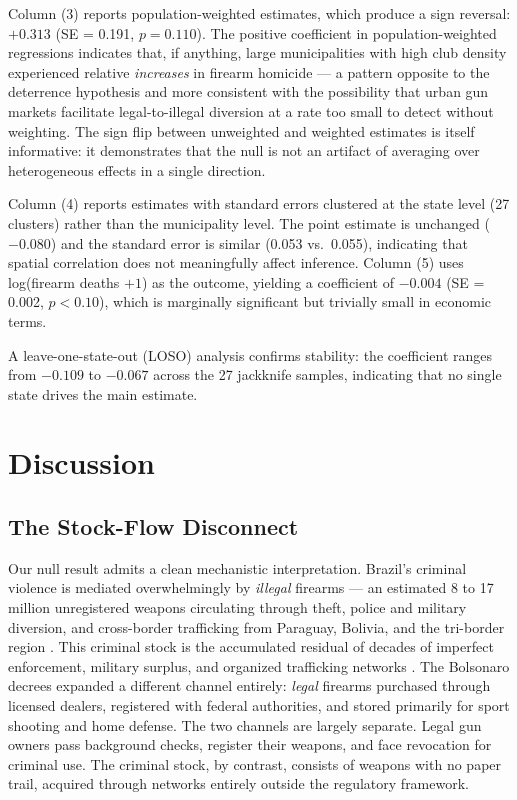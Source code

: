\documentclass[12pt]{article}
\begin{document}
Column (3) reports population-weighted estimates, which produce a sign reversal: $+0.313$ (SE = 0.191, $p = 0.110$). The positive coefficient in population-weighted regressions indicates that, if anything, large municipalities with high club density experienced relative \textit{increases} in firearm homicide --- a pattern opposite to the deterrence hypothesis and more consistent with the possibility that urban gun markets facilitate legal-to-illegal diversion at a rate too small to detect without weighting. The sign flip between unweighted and weighted estimates is itself informative: it demonstrates that the null is not an artifact of averaging over heterogeneous effects in a single direction.

Column (4) reports estimates with standard errors clustered at the state level (27 clusters) rather than the municipality level. The point estimate is unchanged ($-0.080$) and the standard error is similar (0.053 vs.\ 0.055), indicating that spatial correlation does not meaningfully affect inference. Column (5) uses log(firearm deaths $+ 1$) as the outcome, yielding a coefficient of $-0.004$ (SE = 0.002, $p < 0.10$), which is marginally significant but trivially small in economic terms.

A leave-one-state-out (LOSO) analysis confirms stability: the coefficient ranges from $-0.109$ to $-0.067$ across the 27 jackknife samples, indicating that no single state drives the main estimate.

{\small}


\section{Discussion}
\label{sec:discussion}

\subsection{The Stock-Flow Disconnect}

Our null result admits a clean mechanistic interpretation. Brazil's criminal violence is mediated overwhelmingly by \textit{illegal} firearms --- an estimated 8 to 17 million unregistered weapons circulating through theft, police and military diversion, and cross-border trafficking from Paraguay, Bolivia, and the tri-border region \citep{cerqueira2004, fbsp2022armas}. This criminal stock is the accumulated residual of decades of imperfect enforcement, military surplus, and organized trafficking networks \citep{dubevargas2013}. The Bolsonaro decrees expanded a different channel entirely: \textit{legal} firearms purchased through licensed dealers, registered with federal authorities, and stored primarily for sport shooting and home defense. The two channels are largely separate. Legal gun owners pass background checks, register their weapons, and face revocation for criminal use. The criminal stock, by contrast, consists of weapons with no paper trail, acquired through networks entirely outside the regulatory framework.
\end{document}
